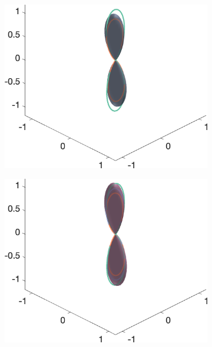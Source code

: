 \begin{figure}
{\begin{minipage}[c]{\textwidth}
\begin{subfigure}[]{0.245\textwidth}
  \end{subfigure}
  \begin{subfigure}[]{0.245\textwidth}
    \includegraphics[width=\textwidth]{figures/frf_experiment/fibres_fod_3D_kappa6_b_3000n_3}
  \end{subfigure}
  \begin{subfigure}[]{0.245\textwidth}
    \includegraphics[width=\textwidth]{figures/frf_experiment/fibres_fod_3D_kappa6_b_3000n_4_f1}
  \end{subfigure}

\end{minipage}}
\end{figure}
